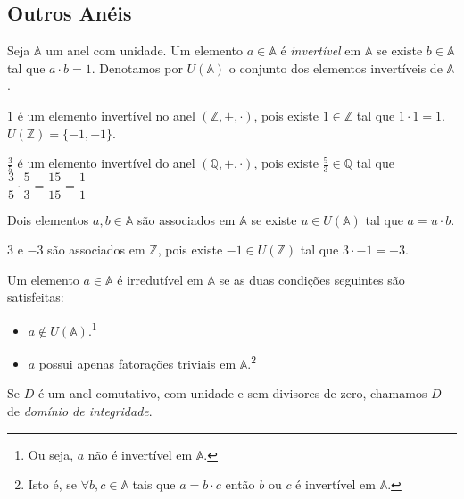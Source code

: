 \subsection{Outros Anéis}

\begin{df}
Seja $\mathbb{A}$ um anel com unidade. Um elemento $a \in \mathbb{A}$ é \emph{invertível} em $\mathbb{A}$ se existe $b \in \mathbb{A}$ tal que $a\cdot b=1$. Denotamos por $U(\mathbb{A})$ o conjunto dos elementos invertíveis de $\mathbb{A}$.
\end{df}
\begin{exemplo}
$1$ é um elemento invertível no anel $(\mathbb{Z},+, \cdot)$, pois existe $1 \in \mathbb{Z}$ tal que $1\cdot 1 = 1$. $U(\mathbb{Z})=\{-1, +1\}$. \par $\frac{3}{5}$ é um elemento invertível do anel $(\mathbb{Q}, +, \cdot )$, pois existe $\frac{5}{3}\in \mathbb{Q}$ tal que $\dfrac{3}{5}\cdot \dfrac{5}{3} = \dfrac{15}{15}=\dfrac{1}{1}$
\end{exemplo}

\begin{df}
Dois elementos $a,b \in \mathbb{A}$ são associados em $\mathbb{A}$ se existe $u \in U(\mathbb{A})$ tal que $a=u\cdot b$.
\end{df}
\begin{exemplo}
$3$ e $-3$ são associados em $\mathbb{Z}$, pois existe $-1 \in U(\mathbb{Z})$ tal que $3\cdot -1 = -3$. \par 
\end{exemplo}

\begin{df}
Um elemento $a \in \mathbb{A}$ é irredutível em $\mathbb{A}$ se as duas condições seguintes são satisfeitas:
\begin{itemize}
\item $a \notin U(\mathbb{A})$.\footnote{Ou seja, $a$ não é invertível em $\mathbb{A}$.}
\item $a$ possui apenas fatorações triviais em $\mathbb{A}$.\footnote{Isto é, se $ \forall b,c \in \mathbb{A}$  tais que $a=b \cdot c$ então $b$ ou $c$ é invertível em $\mathbb{A}$.}
\end{itemize}
\end{df}



\begin{df}
Se $D$ é um anel comutativo, com unidade e sem divisores de zero, chamamos $D$ de \emph{domínio de integridade}.
\end{df}
